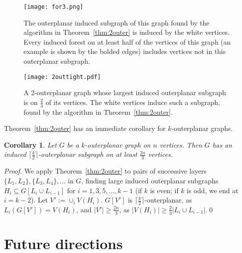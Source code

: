 \documentclass[11pt]{article}
\newtheorem{corollary}[theorem]{Corollary}
\begin{document}
\begin{figure}
\centering
\texttt{[image: for3.png]}
\caption{The outerplanar induced subgraph of this graph found by the algorithm in Theorem~\ref{thm:2outer} is induced by the white vertices. Every induced forest on at least half of the vertices of this graph (an example is shown by the bolded edges) includes vertices not in this outerplanar subgraph.}
\label{fig:for}
\end{figure}

\begin{figure}
\centering
\texttt{[image: 2outtight.pdf]}
\caption{A 2-outerplanar graph whose largest induced outerplanar subgraph is on $\frac{2}{3}$ of its vertices. The white vertices induce such a subgraph, found by the algorithm in Theorem~\ref{thm:2outer}.}
\label{fig:manyoct}
\end{figure}

Theorem~\ref{thm:2outer} has an immediate corollary for $k$-outerplanar graphs.

\begin{corollary}
Let $G$ be a $k$-outerplanar graph on $n$ vertices. Then $G$ has an induced $\lceil{\frac{k}{2}}\rceil$-outerplanar subgraph on at least $\frac{2n}{3}$ vertices.
\end{corollary}

\begin{proof}
We apply Theorem~\ref{thm:2outer} to pairs of successive layers $\{L_1,L_2\}, \{L_3,L_4\},\ldots$ in $G$, finding large induced outerplanar subgraphs $H_i \subseteq G[L_i\cup L_{i-1}]$ for $i=1, 3, 5, \ldots, k-1$ (if $k$ is even; if $k$ is odd, we end at $i=k-2$). Let $V':=\cup_i V(H_i)$. $G[V']$ is $\lceil{\frac{k}{2}}\rceil$-outerplanar, as $L_i(G[V'])=V(H_i)$, and $|V'|\geq \frac{2n}{3}$, as $|V(H_i)|\geq \frac{2}{3}|L_i \cup L_{i-1}|$.\qed
\end{proof}



\section{Future directions}
\end{document}
